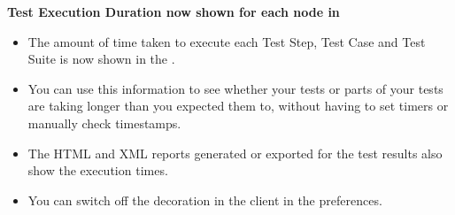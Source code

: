 \textbf{Test Execution Duration now shown for each node in \gdtestresultview{}}\\
\begin{itemize}
\item The amount of time taken to execute each Test Step, Test Case and Test Suite is now shown in the \gdtestresultview{}.
\item You can use this information to see whether your tests or parts of your tests are taking longer than you expected them to, 
without having to set timers or manually check timestamps.
\item The HTML and XML reports generated or exported for the test results also show the execution times.
\item You can switch off the decoration in the \app{} client in the  preferences.
\end{itemize} 




